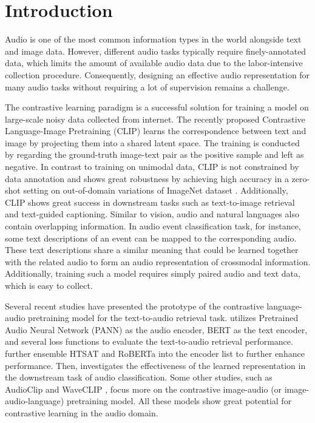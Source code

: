 \section{Introduction}
Audio is one of the most common information types in the world alongside text and image data.
However, different audio tasks typically require finely-annotated data, which limits the amount of available audio data due to the labor-intensive collection procedure. 
Consequently, designing an effective audio representation for many audio tasks without requiring a lot of supervision remains a challenge.

The contrastive learning paradigm is a successful solution for training a model on large-scale noisy data collected from internet. 
The recently proposed Contrastive Language-Image Pretraining (CLIP) \cite{clip} learns the correspondence between text and image by projecting them into a shared latent space. The training is conducted by regarding the ground-truth image-text pair as the positive sample and left as negative. 
In contrast to training on unimodal data, CLIP is not constrained by data annotation and shows great robustness by achieving high accuracy in a zero-shot setting on out-of-domain variations of ImageNet dataset \cite{imagenet}. 
Additionally, CLIP shows great success in downstream tasks such as text-to-image retrieval and text-guided captioning. 
Similar to vision, audio and natural languages also contain overlapping information.
In audio event classification task, for instance, some text descriptions of an event can be mapped to the corresponding audio.
These text descriptions share a similar meaning that could be learned together with the related audio to form an audio representation of crossmodal information. Additionally, training such a model requires simply paired audio and text data, which is easy to collect.

Several recent studies \cite{audioclip,clap,clap-retrieval,yuke-dcase,mmt,ml-act,wav2clip} have presented the prototype of the contrastive language-audio pretraining model for the text-to-audio retrieval task. 
\cite{yuke-dcase} utilizes Pretrained Audio Neural Network (PANN) \cite{pann} as the audio encoder, BERT \cite{bert} as the text encoder, and several loss functions to evaluate the text-to-audio retrieval performance.
\cite{clap-retrieval} further ensemble HTSAT \cite{hts-at} and RoBERTa \cite{roberta} into the encoder list to further enhance performance.
Then, \cite{clap} investigates the effectiveness of the learned representation in the downstream task of audio classification.
Some other studies, such as AudioClip \cite{audioclip} and WaveCLIP \cite{wav2clip}, focus more on the contrastive image-audio (or image-audio-language) pretraining model. 
All these models show great potential for contrastive learning in the audio domain.

